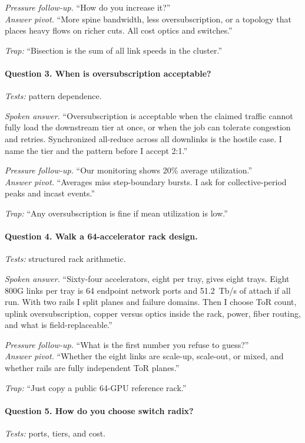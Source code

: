 \textit{Pressure follow-up.} ``How do you increase it?''\\
\textit{Answer pivot.} ``More spine bandwidth, less oversubscription, or a
topology that places heavy flows on richer cuts. All cost optics and switches.''

\textit{Trap:} ``Bisection is the sum of all link speeds in the cluster.''

\paragraph{Question 3. When is oversubscription acceptable?}
\textit{Tests:} pattern dependence.

\textit{Spoken answer.}
``Oversubscription is acceptable when the claimed traffic cannot fully load the
downstream tier at once, or when the job can tolerate congestion and retries.
Synchronized all-reduce across all downlinks is the hostile case. I name the
tier and the pattern before I accept 2:1.''

\textit{Pressure follow-up.} ``Our monitoring shows 20\% average utilization.''\\
\textit{Answer pivot.} ``Averages miss step-boundary bursts. I ask for
collective-period peaks and incast events.''

\textit{Trap:} ``Any oversubscription is fine if mean utilization is low.''

\paragraph{Question 4. Walk a 64-accelerator rack design.}
\textit{Tests:} structured rack arithmetic.

\textit{Spoken answer.}
``Sixty-four accelerators, eight per tray, gives eight trays. Eight 800G links
per tray is 64 endpoint network ports and 51.2~Tb/s of attach if all run.
With two rails I split planes and failure domains. Then I choose ToR count,
uplink oversubscription, copper versus optics inside the rack, power, fiber
routing, and what is field-replaceable.''

\textit{Pressure follow-up.} ``What is the first number you refuse to guess?''\\
\textit{Answer pivot.} ``Whether the eight links are scale-up, scale-out, or
mixed, and whether rails are fully independent ToR planes.''

\textit{Trap:} ``Just copy a public 64-GPU reference rack.''

\paragraph{Question 5. How do you choose switch radix?}
\textit{Tests:} ports, tiers, and cost.

